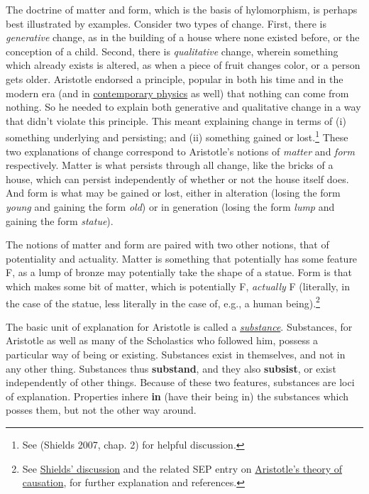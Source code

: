 \documentclass[12pt]{article}
\makeatletter
\newcommand{\citeprocitem}[2]{\hyper@linkstart{cite}{citeproc_bib_item_#1}#2\hyper@linkend}
\makeatother
\begin{document}
The doctrine of matter and form, which is the basis of hylomorphism, is perhaps best
illustrated by examples. Consider two types of change. First, there is \emph{generative}
change, as in the building of a house where none existed before, or the conception of
a child. Second, there is \emph{qualitative} change, wherein something which already exists
is altered, as when a piece of fruit changes color, or a person gets older. Aristotle
endorsed a principle, popular in both his time and in the modern era (and in
\href{http://www.nytimes.com/2012/03/25/books/review/a-universe-from-nothing-by-lawrence-m-krauss.html}{contemporary physics} as well) that nothing can come from nothing. So he needed to
explain both generative and qualitative change in a way that didn't violate this
principle. This meant explaining change in terms of (i) something underlying and
persisting; and (ii) something gained or lost.\footnote{See (\citeprocitem{5}{Shields 2007, chap. 2}) for helpful discussion.} These two explanations of change
correspond to Aristotle's notions of \emph{matter} and \emph{form} respectively. Matter is what
persists through all change, like the bricks of a house, which can persist
independently of whether or not the house itself does. And form is what may be gained or
lost, either in alteration (losing the form \emph{young} and gaining the form \emph{old}) or in
generation (losing the form \emph{lump} and gaining the form \emph{statue}).

The notions of matter and form are paired with two other notions, that of
potentiality and actuality. Matter is something that potentially has some feature F,
as a lump of bronze may potentially take the shape of a statue. Form is that which
makes some bit of matter, which is potentially F, \emph{actually} F (literally, in the case
of the statue, less literally in the case of, e.g., a human being).\footnote{See \href{http://plato.stanford.edu/entries/aristotle/\#Hyl}{Shields' discussion} and the related SEP entry on \href{https://plato.stanford.edu/entries/aristotle-causality/}{Aristotle's theory of
causation}, for further explanation and references.}

The basic unit of explanation for Aristotle is called a \href{http://plato.stanford.edu/entries/aristotle/\#Sub}{\emph{substance}}. Substances, for
Aristotle as well as many of the Scholastics who followed him, possess a particular
way of being or existing. Substances exist in themselves, and not in any other thing.
Substances thus \textbf{substand}, and they also \textbf{subsist}, or exist independently of other
things. Because of these two features, substances are loci of explanation. Properties
inhere \textbf{in} (have their being in) the substances which posses them, but not the other
way around.
\end{document}
